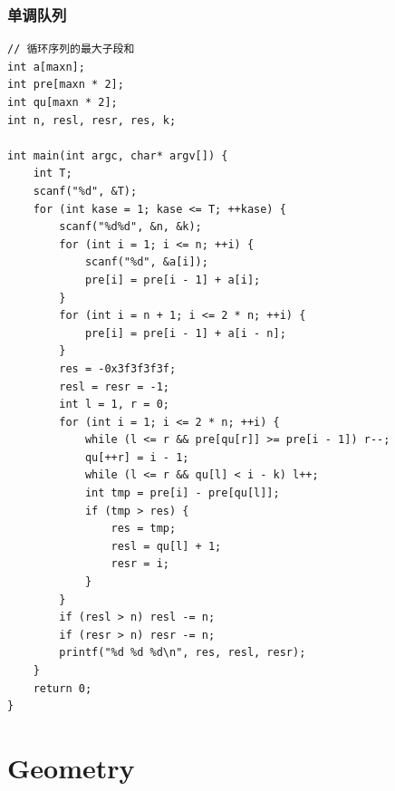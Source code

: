 \documentclass[twoside]{article}
\begin{document}
\subsubsection{单调队列}
\begin{lstlisting}
// 循环序列的最大子段和
int a[maxn];
int pre[maxn * 2];
int qu[maxn * 2];
int n, resl, resr, res, k;

int main(int argc, char* argv[]) {
    int T;
    scanf("%d", &T);
    for (int kase = 1; kase <= T; ++kase) {
        scanf("%d%d", &n, &k);
        for (int i = 1; i <= n; ++i) {
            scanf("%d", &a[i]);
            pre[i] = pre[i - 1] + a[i];
        }
        for (int i = n + 1; i <= 2 * n; ++i) {
            pre[i] = pre[i - 1] + a[i - n];
        }
        res = -0x3f3f3f3f;
        resl = resr = -1;
        int l = 1, r = 0;
        for (int i = 1; i <= 2 * n; ++i) {
            while (l <= r && pre[qu[r]] >= pre[i - 1]) r--;
            qu[++r] = i - 1;
            while (l <= r && qu[l] < i - k) l++;
            int tmp = pre[i] - pre[qu[l]];
            if (tmp > res) {
                res = tmp;
                resl = qu[l] + 1;
                resr = i;
            }
        }
        if (resl > n) resl -= n;
        if (resr > n) resr -= n;
        printf("%d %d %d\n", res, resl, resr);
    }
    return 0;
}\end{lstlisting}
\clearpage\section{Geometry}
\end{document}

